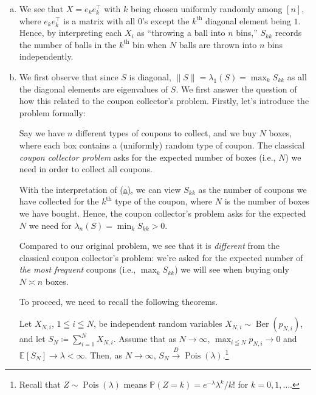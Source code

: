 \begin{answer}
	\begin{enumerate}[(a)]
		\item We see that \(X = e_k e_k ^{\top} \) with \(k\) being chosen uniformly randomly among \([n]\), where \(e_k e_k ^{\top} \) is a matrix with all \(0\)'s except the \(k^{\text{th} }\) diagonal element being \(1\). Hence, by interpreting each \(X_i\) as ``throwing a ball into \(n\) bins,'' \(S_{k k}\) records the number of balls in the \(k^{\text{th} }\) bin when \(N\) balls are thrown into \(n\) bins independently.
		\item We first observe that since \(S\) is diagonal, \(\lVert S \rVert = \lambda _1(S) = \max _k S_{k k}\) as all the diagonal elements are eigenvalues of \(S\). We first answer the question of how this related to the coupon collector's problem. Firstly, let's introduce the problem formally:

		      \begin{problem}
		      Say we have \(n\) different types of coupons to collect, and we buy \(N\) boxes, where each box contains a (uniformly) random type of coupon. The classical \emph{coupon collector problem} asks for the expected number of boxes (i.e., \(N\)) we need in order to collect all coupons.
		      \end{problem}

		      With the interpretation of \hyperref[ex5.4.14:a]{(a)}, we can view \(S_{k k}\) as the number of coupons we have collected for the \(k^{\text{th}}\) type of the coupon, where \(N\) is the number of boxes we have bought. Hence, the coupon collector's problem asks for the expected \(N\) we need for \(\lambda _n (S) = \min _{k} S_{k k} > 0\).

		      Compared to our original problem, we see that it is \emph{different} from the classical coupon collector's problem: we're asked for the expected number of \emph{the most frequent} coupons (i.e., \(\max_{k} S_{k k}\)) we will see when buying only \(N \asymp n\) boxes.

		      To proceed, we need to recall the following theorems.

		      \begin{theorem}\label{thm:Poisson-limit}
			      Let \(X_{N, i}\), \(1 \leqq i \leqq N\), be independent random variables \(X_{N, i} \sim \operatorname{Ber}(p_{N, i}) \), and let \(S_N \coloneqq \sum_{i=1}^{N} X_{N, i}\). Assume that as \(N \to \infty \), \(\max _{i \leqq N} p_{N, i} \to 0\) and \(\mathbb{E}_{}[S_N] \to \lambda < \infty \). Then, as \(N \to \infty \), \(S_N \overset{D}{\to} \operatorname{Pois}(\lambda ) \).\footnote{Recall that \(Z \sim \operatorname{Pois}(\lambda ) \) means \(\mathbb{P} (Z = k) = e^{-\lambda } \lambda ^k / k!\) for \(k = 0, 1, \dots \).}
		      \end{theorem}


\end{enumerate}
\end{answer}
